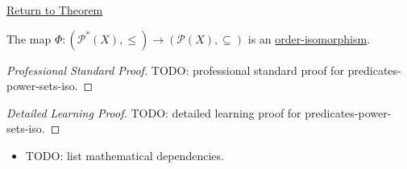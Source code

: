 \newpage
{}
\label{prf:predicates-power-sets-iso}

\begin{remark*}[Return]
\hyperref[prop:predicates-power-sets-iso]{Return to Theorem}
\end{remark*}

\begin{proposition*}
The map $\Phi : (\mathcal{P}^*(X), \leq) \to (\mathcal{P}(X), \subseteq)$
is an \hyperref[def:order-isomorphism]{order-isomorphism}.
\end{proposition*}

\begin{proof}[Professional Standard Proof]
\LRAProofBodyStart
TODO: professional standard proof for predicates-power-sets-iso.
\end{proof}

\begin{proof}[Detailed Learning Proof]
\LRAProofBodyStart
TODO: detailed learning proof for predicates-power-sets-iso.
\end{proof}

\begin{remark*}
\end{remark*}

\begin{dependencies}
\begin{itemize}
  \item TODO: list mathematical dependencies.
\end{itemize}
\end{dependencies}

\clearpage
